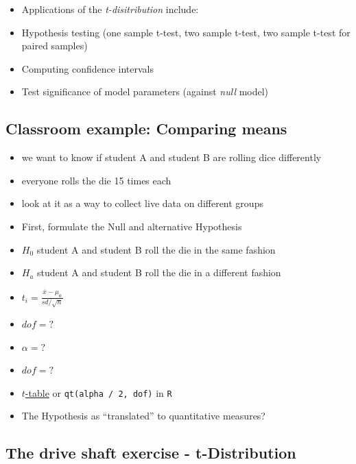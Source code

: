 \documentclass[
  a4paper,
]{scrbook}
\providecommand{\tightlist}{%
  \setlength{\itemsep}{0pt}\setlength{\parskip}{0pt}}\usepackage{longtable,booktabs,array}
\begin{document}
\begin{itemize}
\item
  Applications of the \emph{t-disitribution} include:
\item
  Hypothesis testing (one sample t-test, two sample t-test, two sample
  t-test for paired samples)
\item
  Computing confidence intervals
\item
  Test significance of model parameters (against \emph{null} model)
\end{itemize}

\subsection{Classroom example: Comparing
means}\label{classroom-example-comparing-means}

\begin{itemize}
\tightlist
\item
  we want to know if student A and student B are rolling dice
  differently
\item
  everyone rolls the die 15 times each
\item
  look at it as a way to collect live data on different groups
\item
  First, formulate the Null and alternative Hypothesis
\end{itemize}

\begin{itemize}
\tightlist
\item
  \(H_0\) student A and student B roll the die in the same fashion
\item
  \(H_a\) student A and student B roll the die in a different fashion
\end{itemize}

\begin{itemize}
\tightlist
\item
  \(t_i = \frac{\bar{x} - \mu_0}{sd/\sqrt{n}}\)
\item
  \(dof = ?\)
\item
  \(\alpha = ?\)
\item
  \(dof = ?\)
\item
  \href{https://datatab.de/tutorial/tabelle-t-verteilung}{\(t\)-table}
  or \texttt{qt(alpha\ /\ 2,\ dof)} in \texttt{R}
\item
  The Hypothesis as ``translated'' to quantitative measures?
\end{itemize}

\subsection{The drive shaft exercise -
t-Distribution}\label{the-drive-shaft-exercise---t-distribution}
\end{document}
